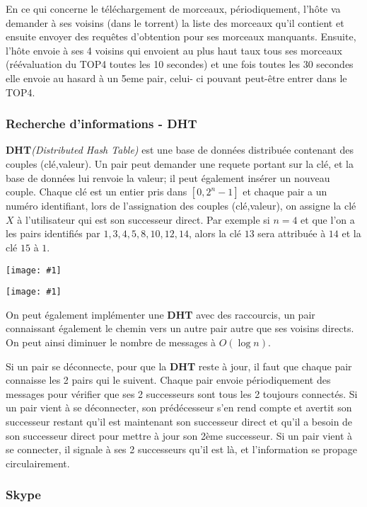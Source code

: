 \documentclass{article}
\newcommand{\imgR}[2]{\begin{center}\texttt{[image: \#1]}\end{center}}
\begin{document}
En ce qui concerne le téléchargement de morceaux, périodiquement, l'hôte va demander à ses voisins (dans le 
torrent) la liste des morceaux qu'il contient et ensuite envoyer des requêtes d'obtention pour ses morceaux 
manquants. Ensuite, l'hôte envoie à ses 4 voisins qui envoient au plus haut taux tous ses morceaux (réévaluation
du TOP4 toutes les 10 secondes) et une fois toutes les 30 secondes elle envoie au hasard à un 5eme pair, celui-
ci pouvant peut-être entrer dans le TOP4.

\subsubsection{Recherche d'informations - DHT}

\textbf{DHT}\textit{(Distributed Hash Table)} est une base de données distribuée contenant des couples 
(clé,valeur). Un pair peut demander une requete portant sur la clé, et la base de données lui renvoie la valeur; 
il peut également insérer un nouveau couple. Chaque clé est un entier pris dans $[0,2^n-1]$ et chaque pair a un 
numéro identifiant, lors de l'assignation des couples (clé,valeur), on assigne la clé $X$ à l'utilisateur qui 
est son successeur direct. Par exemple si $n=4$ et que l'on a les pairs identifiés par $1,3,4,5,8,10,12,14$, 
alors la clé $13$ sera attribuée à $14$ et la clé $15$ à $1$. 

\imgR{CN_023.png}{400}
\imgR{CN_024.png}{400}

\noindent On peut également implémenter une \textbf{DHT} avec des raccourcis, un pair connaissant également le
chemin vers un autre pair autre que ses voisins directs. On peut ainsi diminuer le nombre de messages à $O(\log 
n)$.

Si un pair se déconnecte, pour que la \textbf{DHT} reste à jour, il faut que chaque pair connaisse les 2 pairs
qui le suivent. Chaque pair envoie périodiquement des messages pour vérifier que ses 2 successeurs sont tous
les 2 toujours connectés. Si un pair vient à se déconnecter, son prédécesseur s'en rend compte et avertit son 
successeur restant qu'il est maintenant son successeur direct et qu'il a besoin de son successeur direct pour 
mettre à jour son 2ème successeur. Si un pair vient à se connecter, il signale à ses 2 successeurs qu'il est là,
et l'information se propage circulairement.

\subsubsection{Skype}
\end{document}
